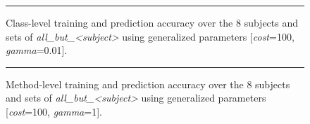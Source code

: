 \begin{figure}[ht!]
  \centering
  \begin{adjustbox}{max size={.95\textwidth}{.95\textheight}}
    
  \end{adjustbox}
  \caption{Class-level training and prediction accuracy over the 8 subjects and sets of \emph{all\_but\_<subject>} using generalized parameters [\emph{cost}=100, \emph{gamma}=0.01].}
  \vspace{2mm}
  \hrule
  \label{fig:prediction_with_parameters_class_graph}
\end{figure}

\begin{figure}[ht!]
  \centering
  \begin{adjustbox}{max size={.95\textwidth}{.95\textheight}}
    
  \end{adjustbox}
  \caption{Method-level training and prediction accuracy over the 8 subjects and sets of \emph{all\_but\_<subject>} using generalized parameters [\emph{cost}=100, \emph{gamma}=1].}
  \vspace{2mm}
  \hrule
  \label{fig:prediction_with_parameters_method_graph}
\end{figure}

